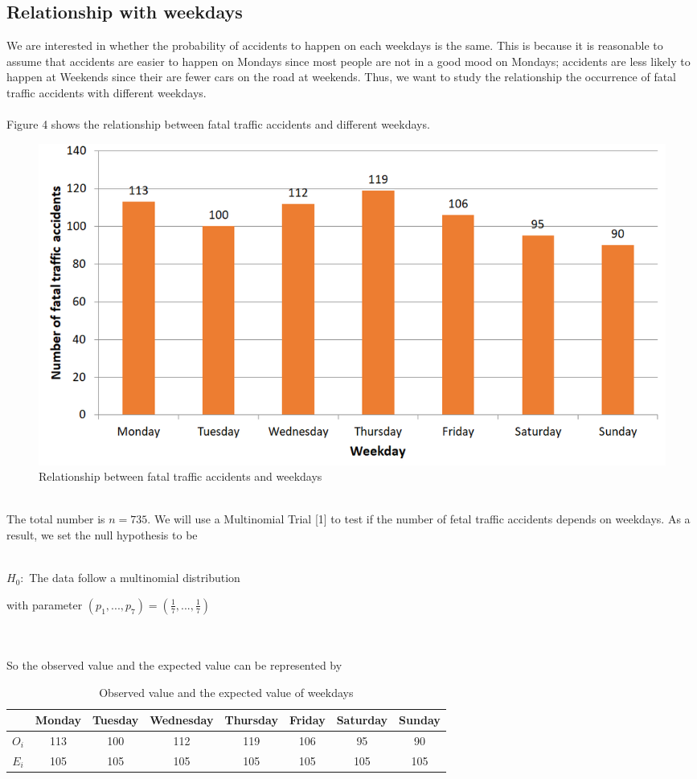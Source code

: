 \documentclass[a4paper,12pt]{article}
\begin{document}
 \subsection{Relationship with weekdays}
 \noindent  We are interested in whether the probability of accidents to happen on each weekdays is the same. This is because it is reasonable to assume that accidents are easier to happen on Mondays since most people are not in a good mood on Mondays; accidents are less likely to happen at Weekends since their are fewer cars on the road at weekends. Thus, we want to study the relationship the occurrence of fatal traffic accidents with different weekdays.
\\\\Figure 4 shows the relationship between fatal traffic accidents and different weekdays.
\begin{figure}[hbp]
\centering
\includegraphics[scale=0.6]{weekday2.PNG}
\caption{Relationship between fatal traffic accidents and  weekdays}
\end{figure}
\noindent\\The total number is $n=735$. We will use a Multinomial Trial [1] to test if the number of fetal traffic accidents depends on weekdays. As a result, we set the null hypothesis to be\\\\
\centerline{$H_0:$ The data follow a multinomial distribution}
\centerline{with parameter $(p_1,...,p_7)=(\frac{1}{7},...,\frac{1}{7})$}
 \\\\So the observed value and the expected value can be represented by
 \begin{table}[H]\centering
\begin{tabular}{|c|c|c|c|c|c|c|c|}
\hline
 &Monday&Tuesday&Wednesday&Thursday&Friday&Saturday&Sunday  \\ \hline
$O_i$&113&100&112&119&106&95&90\\ \hline
$E_i$&105&105&105&105&105&105&105\\ \hline
\end{tabular}
\caption{Observed value and the expected value of  weekdays}
\end{table}
\end{document}
